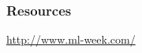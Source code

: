 \begin{frame}
  \frametitle{Resources}

  \vspace{5mm}
  \centerline{\url{http://www.ml-week.com/}}
\end{frame}

\begin{frame}
  \vspace{-.25\textheight}
  \vspace{.25\textheight}
\end{frame}


